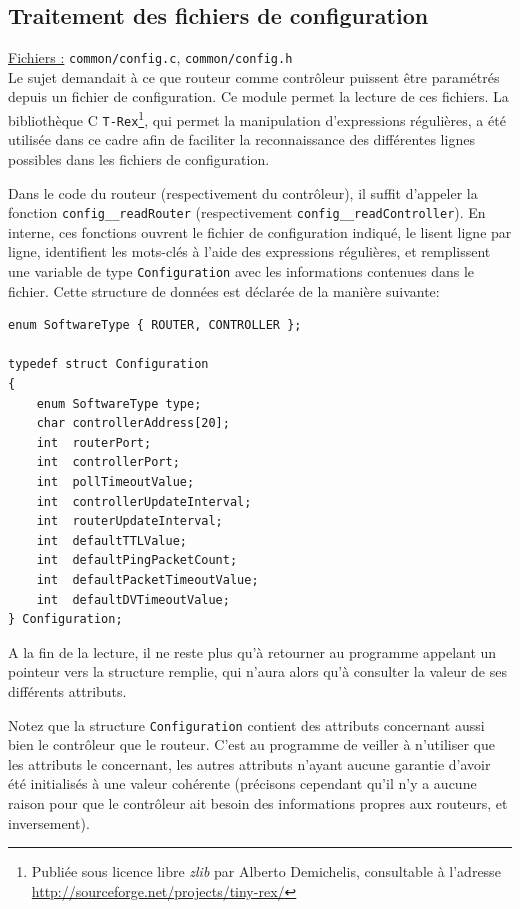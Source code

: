\documentclass[a4paper,11pt]{article}
\begin{document}
\subsection{Traitement des fichiers de configuration}

\underline{Fichiers :} \texttt{common/config.c}, \texttt{common/config.h}\\

Le sujet demandait à ce que routeur comme contrôleur puissent être paramétrés depuis un fichier de configuration. Ce module permet la lecture de ces fichiers. La bibliothèque C \texttt{T-Rex}\footnote{Publiée sous licence libre \textit{zlib} par Alberto Demichelis, consultable à l'adresse \url{http://sourceforge.net/projects/tiny-rex/}}, qui permet la manipulation d'expressions régulières, a été utilisée dans ce cadre afin de faciliter la reconnaissance des différentes lignes possibles dans les fichiers de configuration.

Dans le code du routeur (respectivement du contrôleur), il suffit d'appeler la fonction \texttt{config\_\_readRouter} (respectivement \texttt{config\_\_readController}). En interne, ces fonctions ouvrent le fichier de configuration indiqué, le lisent ligne par ligne, identifient les mots-clés à l'aide des expressions régulières, et remplissent une variable de type \texttt{Configuration} avec les informations contenues dans le fichier. Cette structure de données est déclarée de la manière suivante:

\begin{lstlisting}
enum SoftwareType { ROUTER, CONTROLLER };

typedef struct Configuration
{
	enum SoftwareType type;
	char controllerAddress[20];
	int  routerPort;
	int  controllerPort;
	int  pollTimeoutValue;
	int  controllerUpdateInterval;
	int  routerUpdateInterval;
	int  defaultTTLValue;
	int  defaultPingPacketCount;
	int  defaultPacketTimeoutValue;
	int  defaultDVTimeoutValue;
} Configuration;
\end{lstlisting}

A la fin de la lecture, il ne reste plus qu'à retourner au programme appelant un pointeur vers la structure remplie, qui n'aura alors qu'à consulter la valeur de ses différents attributs.

Notez que la structure \texttt{Configuration} contient des attributs concernant aussi bien le contrôleur que le routeur. C'est au programme de veiller à n'utiliser que les attributs le concernant, les autres attributs n'ayant aucune garantie d'avoir été initialisés à une valeur cohérente (précisons cependant qu'il n'y a aucune raison pour que le contrôleur ait besoin des informations propres aux routeurs, et inversement).
\end{document}
